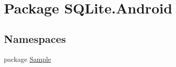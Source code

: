 \hypertarget{namespace_s_q_lite_1_1_android}{\section{Package S\+Q\+Lite.\+Android}
\label{namespace_s_q_lite_1_1_android}
}
\subsection*{Namespaces}
\begin{DoxyCompactItemize}
\item 
package \hyperlink{namespace_s_q_lite_1_1_android_1_1_sample}{Sample}
\end{DoxyCompactItemize}
